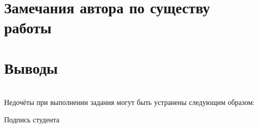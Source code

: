 \section{Замечания автора \textnormal{\small по существу работы} \uline{\hfill}}
\uline{\hfill}

\uline{\hfill}

\uline{\hfill}

\section{Выводы}
\uline{\hfill}

\uline{\hfill}

\uline{\hfill}

\uline{\hfill}

\uline{\hfill}

\uline{\hfill}

\uline{\hfill}

\uline{\hfill}

\uline{\hfill}

\uline{\hfill}

\uline{\hfill}

\uline{\hfill}

\uline{\hfill} \\

Недочёты при выполнении задания могут быть устранены следующим образом: \uline{\hfill}

\uline{\hfill}

\uline{\hfill}

\uline{\hfill}

\uline{\hfill}

\uline{\hfill}

\begin{flushright}
  Подпись студента \uline{\hspace{4cm}} \,\,\,\,\,\,\,\,\,
\end{flushright}